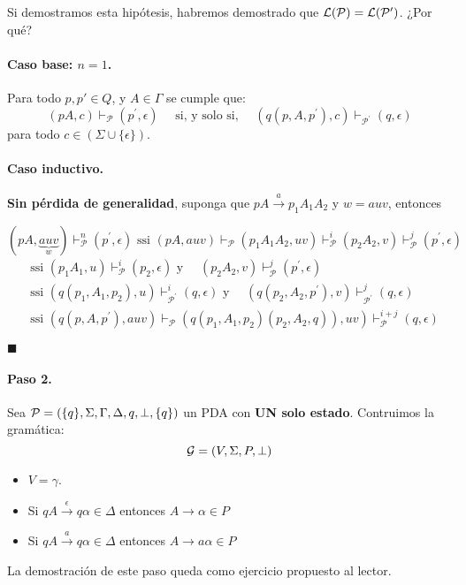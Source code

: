 Si demostramos esta hipótesis, habremos demostrado que $\mathcal{L}(\mathcal{P}) = \mathcal{L}(\mathcal{P'})$. ¿Por qué?

\paragraph{Caso base: $n=1$.} Para todo $p,p' \in Q$, y $A \in \Gamma$ se cumple que:
$$
    (p A, c) \vdash_\mathcal{P}\left(p^{\prime}, \epsilon\right) \quad \text { si, y solo si, } \quad\left(q\left(p, A, p^{\prime}\right), c\right) \vdash_{\mathcal{P}^{\prime}}(q, \epsilon)
$$
para todo $c \in (\Sigma \cup \{\epsilon\})$.

\paragraph{Caso inductivo.} \textbf{Sin pérdida de generalidad}, suponga que $pA \overset{a}{\to} p_1A_1A_2$ y $w=auv$, entonces

$$
    (p A, \underbrace{a u v}_w) \vdash_{\mathcal{P}}^n\left(p^{\prime}, \epsilon\right) \text { ssi }(p A, a u v) \vdash_{\mathcal{P}}\left(p_1 A_1 A_2, u v\right) \vdash_{\mathcal{P}}^i\left(p_2 A_2, v\right) \vdash_{\mathcal{P}}^j\left(p^{\prime}, \epsilon\right)
$$
\begin{align*}
     & \text{ssi }  \left(p_1 A_1, u\right) \vdash_{\mathcal{P}}^i\left(p_2, \epsilon\right) \text { y } \quad\left(p_2 A_2, v\right) \vdash_{\mathcal{P}}^j\left(p^{\prime}, \epsilon\right)                                  \\
     & \text {ssi }  \left(q\left(p_1, A_1, p_2\right), u\right) \vdash_{\mathcal{P}^{\prime}}^i(q, \epsilon) \text { y } \quad\left(q\left(p_2, A_2, p^{\prime}\right), v\right) \vdash_{\mathcal{P}^{\prime}}^j(q, \epsilon) \\
     & \text {ssi }  \left.\left(q\left(p, A, p^{\prime}\right), auv\right) \vdash_{\mathcal{P}}\left(q\left(p_1, A_1, p_2\right)\left(p_2, A_2, q\right)\right), u v\right) \vdash_{\mathcal{P}}^{i+j}(q, \epsilon)
\end{align*}

\hfill $\blacksquare$

\paragraph{Paso 2.} Sea $\mathcal{P}=(\{q\},\Sigma,\Gamma,\Delta,q,\bot,\{q\})$ un PDA con \textbf{UN solo estado}. Contruimos la gramática:
$$
    \mathcal{G} = (V, \Sigma, P, \bot)
$$
\begin{itemize}
    \item $V=\gamma$.
    \item Si $qA \overset{\epsilon}{\to} q\alpha \in \Delta$ entonces $A \to \alpha \in P$
    \item Si $qA \overset{a}{\to} q\alpha \in \Delta$ entonces $A \to a\alpha \in P$
\end{itemize}
La demostración de este paso queda como ejercicio propuesto al lector.

